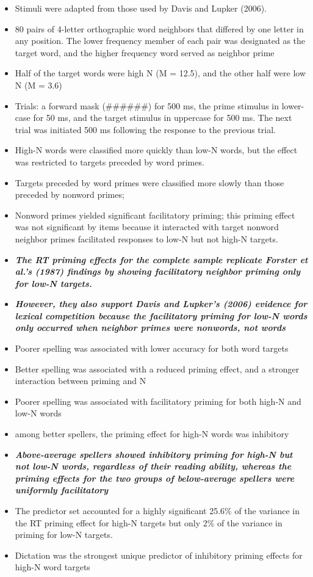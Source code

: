 \documentclass[]{article}
\begin{document}
{\begin{itemize}
		\item Stimuli were adapted from those used by Davis and Lupker (2006).
		\item 80 pairs of 4-letter orthographic word neighbors that differed by one letter in any position. The lower frequency member of each pair was designated as the target word, and the higher frequency word served as neighbor prime
		\item Half of the target words were high N (M = 12.5), and the other half were low N (M = 3.6)
		\item Trials:  a forward mask (\#\#\#\#\#\#) for 500 ms, the prime stimulus in lower-case for 50 ms, and the target stimulus in uppercase for 500 ms. The next trial was initiated 500 ms following the response to the previous trial.
		\item High-N words were classified more quickly than low-N words, but the effect was restricted to targets preceded by word primes.
		\item Targets preceded by word primes were classified more slowly than those preceded by nonword primes; 
		\item Nonword primes yielded significant facilitatory priming; this priming effect was not significant by items because it interacted with target nonword neighbor primes facilitated responses to low-N but not high-N targets.
		\item \textbf{\textit{The RT priming effects for the complete sample replicate Forster et al.’s (1987) findings by showing facilitatory neighbor priming only for low-N targets.}} 
		\item \textbf{\textit{However, they also support Davis and Lupker’s (2006) evidence for lexical competition because the facilitatory priming for low-N words only occurred when neighbor primes were nonwords, not words}}
		\item Poorer spelling was associated with lower accuracy for both word targets
		\item Better spelling was associated with a reduced priming effect, and a stronger interaction between priming and N
		\item Poorer spelling was associated with facilitatory priming for both high-N and low-N words
		\item among better spellers, the priming effect for high-N words was inhibitory
		\item \textit{\textbf{Above-average spellers showed inhibitory priming for high-N but not low-N words, regardless of their reading ability, whereas the priming effects for the two groups of below-average spellers were uniformly facilitatory}}
		\item The predictor set accounted for a highly significant 25.6\% of the variance in the RT priming effect for high-N targets but only 2\% of the variance in priming for low-N targets.
		\item Dictation was the strongest unique predictor of inhibitory priming effects for high-N word targets
	\end{itemize}
	
}
\end{document}
